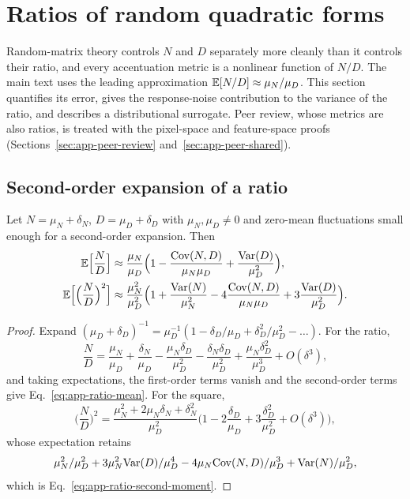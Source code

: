 {\section{Ratios of random quadratic forms}
\label{sec:app-ratio-approximations}
\label{sec:app-ratio-corrections}

Random-matrix theory controls $N$ and $D$ separately more cleanly than it
controls their ratio, and every accentuation metric is a nonlinear function
of $N/D$.  The main text uses the leading approximation
$\mathbb{E}[N/D]\approx\mu_N/\mu_D$.  This section quantifies its error, gives the
response-noise contribution to the variance of the ratio, and describes a
distributional surrogate.  Peer review, whose metrics are also ratios, is
treated with the pixel-space and feature-space proofs
(Sections~\ref{sec:app-peer-review} and~\ref{sec:app-peer-shared}).

\subsection{Second-order expansion of a ratio}
\label{sec:app-ratio-delta}

\begin{prop}
\label{prop:app-ratio-delta}
Let $N=\mu_N+\delta_N$, $D=\mu_D+\delta_D$ with $\mu_N,\mu_D\ne0$ and
zero-mean fluctuations small enough for a second-order expansion.  Then
\begin{align}
\mathbb{E}\Big[\frac ND\Big]&\approx\frac{\mu_N}{\mu_D}
\Big(1-\frac{\mathrm{Cov}(N,D)}{\mu_N\mu_D}+\frac{\mathrm{Var}(D)}{\mu_D^2}\Big),
\label{eq:app-ratio-mean}\\
\mathbb{E}\Big[\Big(\frac ND\Big)^2\Big]&\approx\frac{\mu_N^2}{\mu_D^2}
\Big(1+\frac{\mathrm{Var}(N)}{\mu_N^2}-4\frac{\mathrm{Cov}(N,D)}{\mu_N\mu_D}+3\frac{\mathrm{Var}(D)}{\mu_D^2}\Big).
\label{eq:app-ratio-second-moment}
\end{align}
\end{prop}
\begin{proof}
Expand $(\mu_D+\delta_D)^{-1}=\mu_D^{-1}(1-\delta_D/\mu_D+\delta_D^2/\mu_D^2-\dots)$.
For the ratio,
\[
\frac ND=\frac{\mu_N}{\mu_D}+\frac{\delta_N}{\mu_D}-\frac{\mu_N\delta_D}{\mu_D^2}
-\frac{\delta_N\delta_D}{\mu_D^2}+\frac{\mu_N\delta_D^2}{\mu_D^3}+O(\delta^3),
\]
and taking expectations, the first-order terms vanish and the second-order
terms give Eq.~\ref{eq:app-ratio-mean}.  For the square,
\[
\Big(\frac ND\Big)^2=\frac{\mu_N^2+2\mu_N\delta_N+\delta_N^2}{\mu_D^2}
\Big(1-2\frac{\delta_D}{\mu_D}+3\frac{\delta_D^2}{\mu_D^2}+O(\delta^3)\Big),
\]
whose expectation retains
\[
\mu_N^2/\mu_D^2+3\mu_N^2\mathrm{Var}(D)/\mu_D^4-4\mu_N\mathrm{Cov}(N,D)/\mu_D^3+\mathrm{Var}(N)/\mu_D^2,
\]
which is Eq.~\ref{eq:app-ratio-second-moment}.
\end{proof}

}
